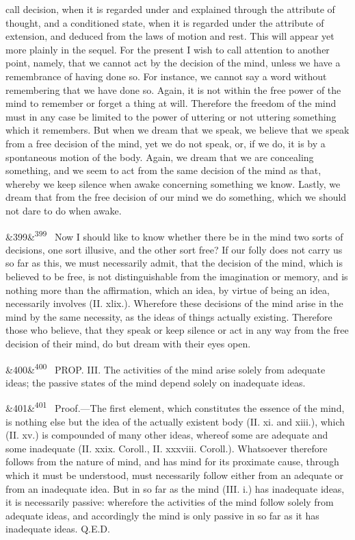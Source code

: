 \documentclass[12pt]{article}
\newcommand{\para}[1][]{\par\noindent\ifx&#1&\else\textsuperscript{\footnotesize #1}~\fi}
\begin{document}
call decision, when it is regarded under and explained through the attribute of thought, and a conditioned state, when it is regarded under the attribute of extension, and deduced from the laws of motion and rest. This will appear yet more plainly in the sequel. For the present I wish to call attention to another point, namely, that we cannot act by the decision of the mind, unless we have a remembrance of having done so. For instance, we cannot say a word without remembering that we have done so. Again, it is not within the free power of the mind to remember or forget a thing at will. Therefore the freedom of the mind must in any case be limited to the power of uttering or not uttering something which it remembers. But when we dream that we speak, we believe that we speak from a free decision of the mind, yet we do not speak, or, if we do, it is by a spontaneous motion of the body. Again, we dream that we are concealing something, and we seem to act from the same decision of the mind as that, whereby we keep silence when awake concerning something we know. Lastly, we dream that from the free decision of our mind we do something, which we should not dare to do when awake.

\para[399] Now I should like to know whether there be in the mind two sorts of decisions, one sort illusive, and the other sort free? If our folly does not carry us so far as this, we must necessarily admit, that the decision of the mind, which is believed to be free, is not distinguishable from the imagination or memory, and is nothing more than the affirmation, which an idea, by virtue of being an idea, necessarily involves (II. xlix.). Wherefore these decisions of the mind arise in the mind by the same necessity, as the ideas of things actually existing. Therefore those who believe, that they speak or keep silence or act in any way from the free decision of their mind, do but dream with their eyes open.

\para[400] PROP. III. The activities of the mind arise solely from adequate ideas; the passive states of the mind depend solely on inadequate ideas.

\para[401] Proof.---The first element, which constitutes the essence of the mind, is nothing else but the idea of the actually existent body (II. xi. and xiii.), which (II. xv.) is compounded of many other ideas, whereof some are adequate and some inadequate (II. xxix. Coroll., II. xxxviii. Coroll.). Whatsoever therefore follows from the nature of mind, and has mind for its proximate cause, through which it must be understood, must necessarily follow either from an adequate or from an inadequate idea. But in so far as the mind (III. i.) has inadequate ideas, it is necessarily passive: wherefore the activities of the mind follow solely from adequate ideas, and accordingly the mind is only passive in so far as it has inadequate ideas. Q.E.D.
\end{document}
